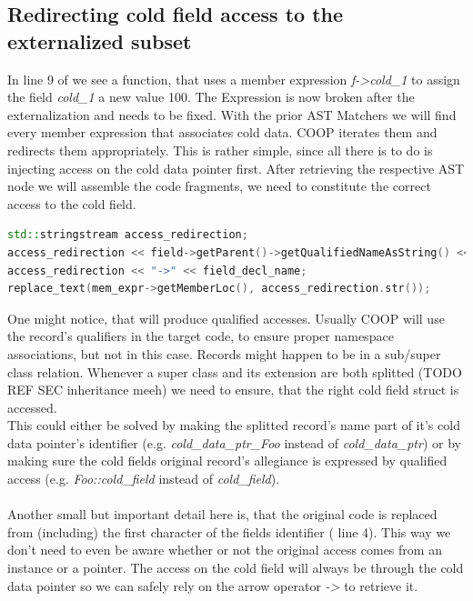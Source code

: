 \subsection{Redirecting cold field access to the externalized subset}
In line 9 of  we see a function, that uses a member expression \textit{f->cold\_1} to assign the field \textit{cold\_1} a new value 100. The Expression is now broken after the externalization and needs to be fixed. With the prior AST Matchers we will find every member expression that associates cold data. COOP iterates them and redirects them appropriately. This is rather simple, since all there is to do is injecting access on the cold data pointer first. After retrieving the respective AST node we will assemble the code fragments, we need to constitute the correct access to the cold field.\\
\begin{lstlisting}[language=C++, name={Assembling the proper access ot a cold field through the additional indirection.}, label={redirect_assembly}, morekeywords={stringstream, std}]
std::stringstream access_redirection;
access_redirection << field->getParent()->getQualifiedNameAsString() << "::";
access_redirection << "->" << field_decl_name;
replace_text(mem_expr->getMemberLoc(), access_redirection.str());
\end{lstlisting}
One might notice, that  will produce qualified accesses. Usually COOP will use the record's qualifiers in the target code, to ensure proper namespace associations, but not in this case. Records might happen to be in a sub/super class relation. Whenever a super class and its extension are both splitted (TODO REF SEC inheritance meeh) we need to ensure, that the right cold field struct is accessed.\\
This could either be solved by making the splitted record's name part of it's cold data pointer's identifier (e.g. \textit{cold\_data\_ptr\_Foo} instead of \textit{cold\_data\_ptr}) or by making sure the cold fields original record's allegiance is expressed by qualified access (e.g. \textit{Foo::cold\_field} instead of \textit{cold\_field}).\\\\
Another small but important detail here is, that the original code is replaced from (including) the first character of the fields identifier ( line 4). This way we don't need to even be aware whether or not the original access comes from an instance or a pointer. The access on the cold field will always be through the cold data pointer so we can safely rely on the arrow operator \textit{->} to retrieve it.

